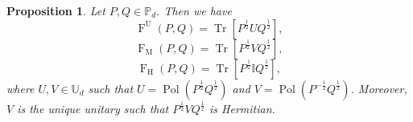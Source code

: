 \documentclass[12pt]{article}
\newtheorem{prop}[theorem]{Proposition}
\theoremstyle{definition}
\begin{document}
\begin{theorembox}
\begin{prop}\label{Prop:NamedFidelitiesUnitary}
Let $P, Q \in \mathbb{P}_d$. Then we have
\begin{equation}
\operatorname{F}^\mathrm{U}(P, Q) = \operatorname{Tr}\left[P^{\frac 12} U Q^{\frac 12}\right],
\end{equation}
\begin{equation}
\operatorname{F}_\mathrm{M}(P, Q) = \operatorname{Tr}\left[P^{\frac 12} V Q^{\frac 12}\right],
\end{equation}
\begin{equation}
\operatorname{F}_\mathrm{H}(P, Q) = \operatorname{Tr}\left[P^{\frac 12} \mathbb I Q^{\frac12} \right],
\end{equation}
where $U, V \in \mathbb{U}_d$ such that $U = \operatorname{Pol}\left(P^{\frac 12} Q^{\frac 12}\right)$ and $V = \operatorname{Pol}\left(P^{-\frac 12} Q^{\frac 12}\right)$. Moreover, $V$ is the unique unitary such that $P^{\frac 12} V Q^{\frac 12}$ is Hermitian.
\end{prop}
\end{theorembox}
\end{document}
